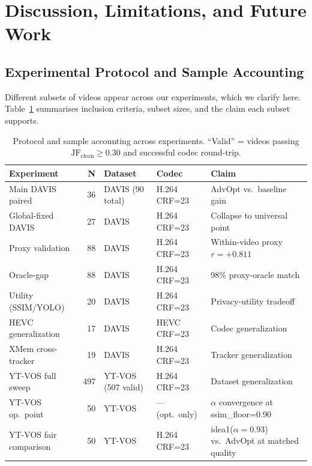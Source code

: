 \section{Discussion, Limitations, and Future Work}
\label{sec:discussion}

\subsection{Experimental Protocol and Sample Accounting}
\label{subsec:accounting}

Different subsets of videos appear across our experiments, which we clarify here.
Table~\ref{tab:protocol} summarises inclusion criteria, subset sizes, and the claim each subset supports.

\begin{table}[h]
\centering
\small
\caption{Protocol and sample accounting across experiments. ``Valid'' = videos passing $\mathrm{JF}_\mathrm{clean} \geq 0.30$ and successful codec round-trip.}
\label{tab:protocol}
\begin{tabular}{lrlll}
\toprule
\textbf{Experiment} & \textbf{N} & \textbf{Dataset} & \textbf{Codec} & \textbf{Claim} \\
\midrule
Main DAVIS paired       & 36  & DAVIS (90 total) & H.264 CRF=23 & AdvOpt vs.\ baseline gain \\
Global-fixed DAVIS      & 27  & DAVIS            & H.264 CRF=23 & Collapse to universal point \\
Proxy validation        & 88  & DAVIS            & H.264 CRF=23 & Within-video proxy $r{=}+0.811$ \\
Oracle-gap              & 88  & DAVIS            & H.264 CRF=23 & 98\% proxy-oracle match \\
Utility (SSIM/YOLO)     & 20  & DAVIS            & H.264 CRF=23 & Privacy-utility tradeoff \\
HEVC generalization     & 17  & DAVIS            & HEVC CRF=23  & Codec generalization \\
XMem cross-tracker      & 19  & DAVIS            & H.264 CRF=23 & Tracker generalization \\
YT-VOS full sweep       & 497 & YT-VOS (507 valid)& H.264 CRF=23 & Dataset generalization \\
YT-VOS op.\ point       & 50  & YT-VOS           & — (opt.\ only)& $\alpha$ convergence at ssim\_floor=0.90 \\
YT-VOS fair comparison  & 50  & YT-VOS           & H.264 CRF=23 & idea1($\alpha{=}0.93$) vs.\ AdvOpt at matched quality \\
\bottomrule
\end{tabular}
\end{table}


